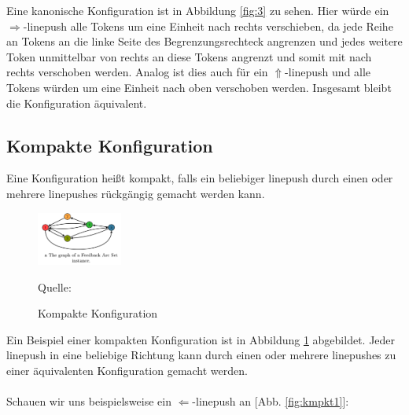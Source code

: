 \documentclass[seminar,german]{algothesis}
\newcommand*{\quelle}{%
  \footnotesize Quelle:
}
\begin{document}
\noindent Eine kanonische Konfiguration ist in Abbildung \ref{fig:3} zu sehen. Hier würde ein $\Rightarrow$-linepush alle Tokens um eine Einheit nach rechts verschieben, da jede Reihe an Tokens an die linke Seite des Begrenzungsrechteck angrenzen und jedes weitere Token unmittelbar von rechts an diese Tokens angrenzt und somit mit nach rechts verschoben werden. Analog ist dies auch für ein $\Uparrow$-linepush und alle Tokens würden um eine Einheit nach oben verschoben werden. Insgesamt bleibt die Konfiguration äquivalent.


\subsection{Kompakte Konfiguration}
\begin{definition}
Eine Konfiguration heißt kompakt, falls ein beliebiger linepush durch einen oder mehrere linepushes rückgängig gemacht werden kann.
\end{definition}
\begin{figure}[ht]
	\centering
	\includegraphics[width=0.25\textwidth]{graph}
	\caption{Kompakte Konfiguration}
	\quelle \cite{akitaya2022pushing}
	\label{fig:4}
\end{figure}
\noindent Ein Beispiel einer kompakten Konfiguration ist in Abbildung \ref{fig:4} abgebildet. Jeder linepush in eine beliebige Richtung kann durch einen oder mehrere linepushes zu einer äquivalenten Konfiguration gemacht werden. \\\\
Schauen wir uns beispielsweise ein $\Leftarrow$-linepush an [Abb. \ref{fig:kmpkt1}]:
\end{document}
